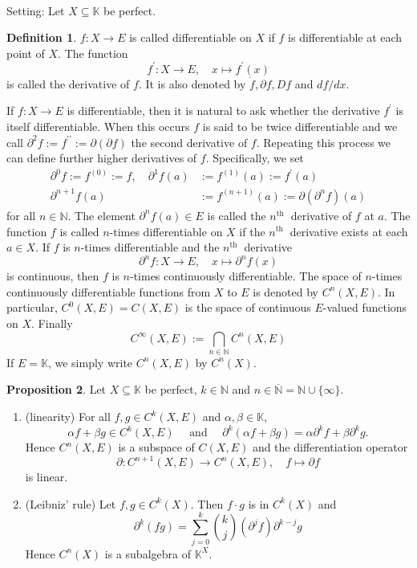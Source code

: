 \documentclass[12pt,a4paper]{book}
\newenvironment{prooff}{{\noindent\it\textcolor{cyan!40!black}{Proof}:}\,}{\par}
\newcommand{\bb}[1]{\mathbb{#1}}
\newenvironment{enu}{\begin{enumerate}[(1)]}{\end{enumerate}}
\theoremstyle{definition}
\newtheorem{defn}{Definition}[section]
\newtheorem{prop}[defn]{Proposition}
\begin{document}
\begin{prooff}
    
\end{prooff}







Setting: Let $X \subseteq \mathbb{K}$ be perfect.
\begin{defn}
    $f: X \rightarrow E$ is called differentiable on $X$ if $f$ is differentiable at each point of $X$. The function
    $$
    f^{\prime}: X \rightarrow E, \quad x \mapsto f^{\prime}(x)
    $$  
    is called the derivative of $f$. It is also denoted by $\dot{f}, \partial f, D f$ and $d f / d x$.

    If $f: X \rightarrow E$ is differentiable, then it is natural to ask whether the derivative $f^{\prime}$ is itself differentiable. When this occurs $f$ is said to be twice differentiable and we
call $\partial^2 f:=f^{\prime \prime}:=\partial(\partial f)$ the second derivative of $f$. Repeating this process we can define further higher derivatives of $f$. Specifically, we set
$$
\begin{aligned}
\partial^0 f:=f^{(0)}:=f, \quad \partial^1 f(a) & :=f^{(1)}(a):=f^{\prime}(a) \\
\partial^{n+1} f(a) & :=f^{(n+1)}(a):=\partial\left(\partial^n f\right)(a)
\end{aligned}
$$
for all $n \in \mathbb{N}$. The element $\partial^n f(a) \in E$ is called the $n^{\text {th }}$ derivative of $f$ at $a$. The function $f$ is called $n$-times differentiable on $X$ if the $n^{\text {th }}$ derivative exists at each $a \in X$. If $f$ is $n$-times differentiable and the $n^{\text {th }}$ derivative
$$
\partial^n f: X \rightarrow E, \quad x \mapsto \partial^n f(x)
$$
is continuous, then $f$ is $n$-times continuously differentiable.
The space of $n$-times continuously differentiable functions from $X$ to $E$ is denoted by $C^n(X, E)$. In particular, $C^0(X, E)=C(X, E)$ is the space of continuous $E$-valued functions on $X$. Finally
$$
C^{\infty}(X, E):=\bigcap_{n \in \mathbb{N}} C^n(X, E)
$$
If $E=\bb{K}$, we simply write $C^n(X,E)$ by $C^n(X)$.

\end{defn}
\begin{prop}
    Let $X \subseteq \mathbb{K}$ be perfect, $k \in \mathbb{N}$ and $n \in \overline{\mathbb{N}}=\mathbb{N} \cup\{\infty\}$.
    \begin{enu}
    \item (linearity) For all $f, g \in C^k(X, E)$ and $\alpha, \beta \in \mathbb{K}$,
    $$
    \alpha f+\beta g \in C^k(X, E) \quad \text { and } \quad \partial^k(\alpha f+\beta g)=\alpha \partial^k f+\beta \partial^k g .
    $$
    Hence $C^n(X, E)$ is a subspace of $C(X, E)$ and the differentiation operator
    $$
    \partial: C^{n+1}(X, E) \rightarrow C^n(X, E), \quad f \mapsto \partial f
    $$
    is linear.
    \item (Leibniz' rule) Let $f, g \in C^k(X)$. Then $f \cdot g$ is in $C^k(X)$ and
    $$
    \partial^k(f g)=\sum_{j=0}^k\binom{k}{j}\left(\partial^j f\right) \partial^{k-j} g
    $$
    Hence $C^n(X)$ is a subalgebra of $\mathbb{K}^X$.
    \end{enu}
\end{prop}
\end{document}
